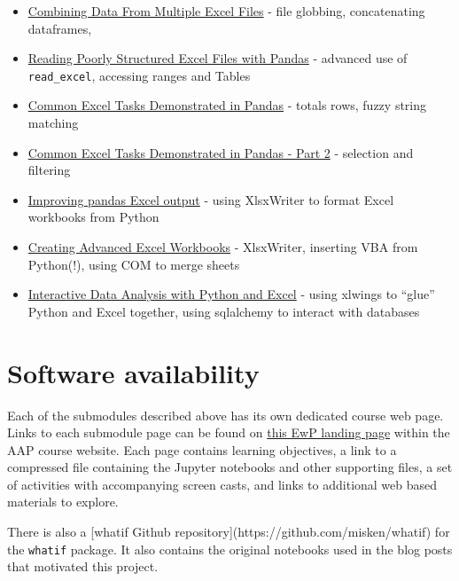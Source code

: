\documentclass[ited,blindrev]{informs3}              %
\newcommand{\code}[1]{\texttt{#1}}
\begin{document}
\begin{itemize}
	\item
	\href{https://pbpython.com/excel-file-combine.html}{Combining Data
		From Multiple Excel Files} - file globbing, concatenating dataframes,
	\item
	\href{https://pbpython.com/pandas-excel-range.html}{Reading Poorly
		Structured Excel Files with Pandas} - advanced use of
	\texttt{read\_excel}, accessing ranges and Tables
	\item
	\href{https://pbpython.com/excel-pandas-comp.html}{Common Excel Tasks
		Demonstrated in Pandas} - totals rows, fuzzy string matching
	\item
	\href{https://pbpython.com/excel-pandas-comp-2.html}{Common Excel
		Tasks Demonstrated in Pandas - Part 2} - selection and filtering
	\item
	\href{https://pbpython.com/improve-pandas-excel-output.html}{Improving
		pandas Excel output} - using XlsxWriter to format Excel workbooks from
	Python
	\item
	\href{https://pbpython.com/advanced-excel-workbooks.html}{Creating
		Advanced Excel Workbooks} - XlsxWriter, inserting VBA from Python(!),
	using COM to merge sheets
	\item
	\href{https://pbpython.com/xlwings-pandas-excel.html}{Interactive Data
		Analysis with Python and Excel} - using xlwings to ``glue'' Python and
	Excel together, using sqlalchemy to interact with databases
\end{itemize}


\section{Software availability}

Each of the submodules described above has its own dedicated course web page. Links to each submodule page can be found on \href{http://www.sba.oakland.edu/faculty/isken/courses/mis6900/mod3_excel_with_python.html}{this EwP landing page} within the AAP course website. Each page contains learning objectives, a link to a compressed file containing the Jupyter notebooks and other supporting files, a set of activities with accompanying screen casts, and links to additional web based materials to explore.

There is also a [whatif Github repository](https://github.com/misken/whatif) for the \code{whatif} package. It also contains the original notebooks used in the blog posts that motivated this project.
\end{document}
